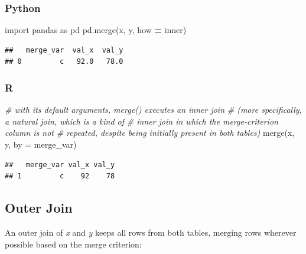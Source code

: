 \documentclass[
]{book}
\newenvironment{Shaded}{\begin{snugshade}}{\end{snugshade}}
\newcommand{\AttributeTok}[1]{\textcolor[rgb]{0.77,0.63,0.00}{#1}}
\newcommand{\CommentTok}[1]{\textcolor[rgb]{0.56,0.35,0.01}{\textit{#1}}}
\newcommand{\FunctionTok}[1]{\textcolor[rgb]{0.00,0.00,0.00}{#1}}
\newcommand{\ImportTok}[1]{#1}
\newcommand{\NormalTok}[1]{#1}
\newcommand{\OperatorTok}[1]{\textcolor[rgb]{0.81,0.36,0.00}{\textbf{#1}}}
\newcommand{\StringTok}[1]{\textcolor[rgb]{0.31,0.60,0.02}{#1}}
\begin{document}
\hypertarget{python-36}{%
\subsubsection*{Python}\label{python-36}}

\begin{Shaded}
\begin{Highlighting}[]
\ImportTok{import}\NormalTok{ pandas }\ImportTok{as}\NormalTok{ pd}
\NormalTok{pd.merge(x, y, how }\OperatorTok{=} \StringTok{\textquotesingle{}inner\textquotesingle{}}\NormalTok{)}
\end{Highlighting}
\end{Shaded}

\begin{verbatim}
##   merge_var  val_x  val_y
## 0         c   92.0   78.0
\end{verbatim}

\hypertarget{r-36}{%
\subsubsection*{R}\label{r-36}}

\begin{Shaded}
\begin{Highlighting}[]
\CommentTok{\# with its default arguments, merge() executes an inner join}
\CommentTok{\# (more specifically, a natural join, which is a kind of}
\CommentTok{\# inner join in which the merge{-}criterion column is not}
\CommentTok{\# repeated, despite being initially present in both tables)}
\FunctionTok{merge}\NormalTok{(x, y, }\AttributeTok{by =} \StringTok{\textquotesingle{}merge\_var\textquotesingle{}}\NormalTok{)}
\end{Highlighting}
\end{Shaded}

\begin{verbatim}
##   merge_var val_x val_y
## 1         c    92    78
\end{verbatim}

\hypertarget{outer-join}{%
\subsection{Outer Join}\label{outer-join}}

An outer join of \emph{x} and \emph{y} keeps all rows from both tables, merging rows wherever possible based on the merge criterion:
\end{document}
